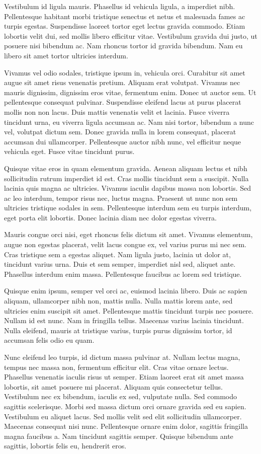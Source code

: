 \documentclass[11pt]{article}
\begin{document}
Vestibulum id ligula mauris. Phasellus id vehicula ligula, a imperdiet
nibh. Pellentesque habitant morbi tristique senectus et netus et
malesuada fames ac turpis egestas. Suspendisse laoreet tortor eget
lectus gravida commodo. Etiam lobortis velit dui, sed mollis libero
efficitur vitae. Vestibulum gravida dui justo, ut posuere nisi bibendum
ac. Nam rhoncus tortor id gravida bibendum. Nam eu libero sit amet
tortor ultricies interdum.

Vivamus vel odio sodales, tristique ipsum in, vehicula orci. Curabitur
sit amet augue sit amet risus venenatis pretium. Aliquam erat volutpat.
Vivamus nec mauris dignissim, dignissim eros vitae, fermentum enim.
Donec ut auctor sem. Ut pellentesque consequat pulvinar. Suspendisse
eleifend lacus at purus placerat mollis non non lacus. Duis mattis
venenatis velit et lacinia. Fusce viverra tincidunt urna, eu viverra
ligula accumsan ac. Nam nisi tortor, bibendum a nunc vel, volutpat
dictum sem. Donec gravida nulla in lorem consequat, placerat accumsan
dui ullamcorper. Pellentesque auctor nibh nunc, vel efficitur neque
vehicula eget. Fusce vitae tincidunt purus.

Quisque vitae eros in quam elementum gravida. Aenean aliquam lectus et
nibh sollicitudin rutrum imperdiet id est. Cras mollis tincidunt sem a
suscipit. Nulla lacinia quis magna ac ultricies. Vivamus iaculis dapibus
massa non lobortis. Sed ac leo interdum, tempor risus nec, luctus magna.
Praesent ut nunc non sem ultricies tristique sodales in sem.
Pellentesque interdum sem eu turpis interdum, eget porta elit lobortis.
Donec lacinia diam nec dolor egestas viverra.

Mauris congue orci nisi, eget rhoncus felis dictum sit amet. Vivamus
elementum, augue non egestas placerat, velit lacus congue ex, vel varius
purus mi nec sem. Cras tristique sem a egestas aliquet. Nam ligula
justo, lacinia ut dolor at, tincidunt varius urna. Duis et sem semper,
imperdiet nisl sed, aliquet ante. Phasellus interdum enim massa.
Pellentesque faucibus ac lorem sed tristique.

Quisque enim ipsum, semper vel orci ac, euismod lacinia libero. Duis ac
sapien aliquam, ullamcorper nibh non, mattis nulla. Nulla mattis lorem
ante, sed ultricies enim suscipit sit amet. Pellentesque mattis
tincidunt turpis nec posuere. Nullam id est nunc. Nam in fringilla
tellus. Maecenas varius lacinia tincidunt. Nulla eleifend, mauris at
tristique varius, turpis purus dignissim tortor, id accumsan felis odio
eu quam.

Nunc eleifend leo turpis, id dictum massa pulvinar at. Nullam lectus
magna, tempus nec massa non, fermentum efficitur elit. Cras vitae ornare
lectus. Phasellus venenatis iaculis risus ut semper. Etiam laoreet erat
sit amet massa lobortis, sit amet posuere mi placerat. Aliquam quis
consectetur tellus. Vestibulum nec ex bibendum, iaculis ex sed,
vulputate nulla. Sed commodo sagittis scelerisque. Morbi sed massa
dictum orci ornare gravida sed eu sapien. Vestibulum eu aliquet lacus.
Sed mollis velit sed elit sollicitudin ullamcorper. Maecenas consequat
nisi nunc. Pellentesque ornare enim dolor, sagittis fringilla magna
faucibus a. Nam tincidunt sagittis semper. Quisque bibendum ante
sagittis, lobortis felis eu, hendrerit eros.
\end{document}
